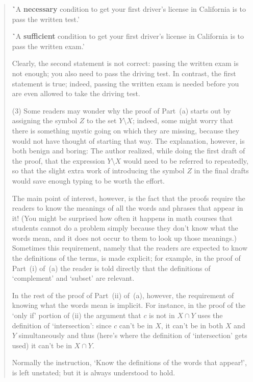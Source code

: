 \begin{quotation}
{        \h `A {\bf necessary} condition to get your first driver's license in California is to pass the written test.'

        \h `A {\bf sufficient} condition to get your first driver's license in California is to pass the written exam.'

\noindent Clearly, the second statement is not correct: passing the written exam is not enough; you also need to pass the driving test.
    In contrast, the first statement is true; indeed, passing the written exam is needed before you are even allowed to take the driving test.

\V

        (3) Some readers may wonder why the proof of Part~(a) starts out by assigning the symbol $Z$ to the set $Y{\setminus}X$;
    indeed, some might worry that there is something mystic going on which they are missing, because they would not have thought of starting that way.
    The explanation, however, is both benign and boring:
    The author realized, while doing the first draft of the proof, that the expression $Y{\setminus}X$ would need to be referred to repeatedly, 
    so that the slight extra work of introducing the symbol $Z$ in the final drafts would save enough typing to be worth the effort.

        The main point of interest, however, is the fact that the proofs require the readers to know the meanings of all the words and phrases that appear in it!
    (You might be surprised how often it happens in math courses that students cannot do a problem simply because they don't know what the words mean, and it does not occur to them to look up those meanings.)
    Sometimes this requirement, namely that the readers are expected to know the definitions of the terms, is made explicit;
    for example, in the proof of Part~(i) of~(a) the reader is told directly that the definitions of `complement' and `subset' are relevant.

        In the rest of the proof of Part~(ii) of~(a), however, the requirement of knowing what the words mean is implicit.
    For instance, in the proof of the `only if' portion of (ii) the argument that $c$ is not in $X{\cap}Y$ uses the definition of `intersection':
    since $c$ can't be in $X$, it can't be in both $X$ and $Y$ simultaneously and thus
    (here's where the definition of `intersection' gets used) it can't be in $X{\cap}Y$.

        Normally the instruction, `Know the definitions of the words that appear!', is left unstated; but it is always understood to hold.

}
\end{quotation}
